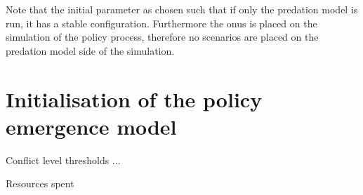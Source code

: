 \documentclass[12pt]{article}
\begin{document}
Note that the initial parameter as chosen such that if only the predation model is run, it has a stable configuration. Furthermore the onus is placed on the simulation of the policy process, therefore no scenarios are placed on the predation model side of the simulation.


\section{Initialisation of the policy emergence model}
\label{sec:}

Conflict level thresholds ...

Resources spent



 

\end{document}
